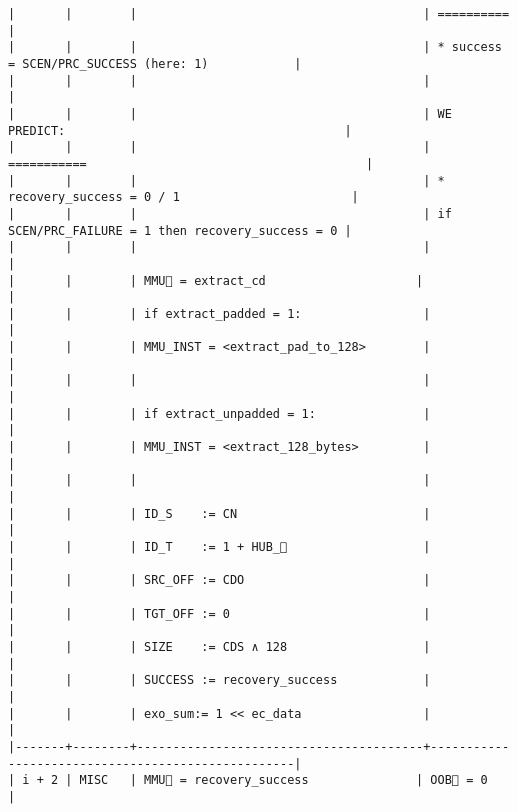 \documentclass[varwidth=\maxdimen,margin=0.5cm,multi={verbatim}]{standalone}
\begin{document}
\begin{verbatim}
|       |        |                                        | ==========                                        |
|       |        |                                        | * success = SCEN/PRC_SUCCESS (here: 1)            |
|       |        |                                        |                                                   |
|       |        |                                        | WE PREDICT:                                       |
|       |        |                                        | ===========                                       |
|       |        |                                        | * recovery_success = 0 / 1                        |
|       |        |                                        | if SCEN/PRC_FAILURE = 1 then recovery_success = 0 |
|       |        |                                        |                                                   |
|       |        | MMU🏴 = extract_cd                     |                                                   |
|       |        | if extract_padded = 1:                 |                                                   |
|       |        | MMU_INST = <extract_pad_to_128>        |                                                   |
|       |        |                                        |                                                   |
|       |        | if extract_unpadded = 1:               |                                                   |
|       |        | MMU_INST = <extract_128_bytes>         |                                                   |
|       |        |                                        |                                                   |
|       |        | ID_S    := CN                          |                                                   |
|       |        | ID_T    := 1 + HUB_                   |                                                   |
|       |        | SRC_OFF := CDO                         |                                                   |
|       |        | TGT_OFF := 0                           |                                                   |
|       |        | SIZE    := CDS ∧ 128                   |                                                   |
|       |        | SUCCESS := recovery_success            |                                                   |
|       |        | exo_sum:= 1 << ec_data                 |                                                   |
|-------+--------+----------------------------------------+---------------------------------------------------|
| i + 2 | MISC   | MMU🏴 = recovery_success               | OOB🏴 = 0                                         |

\end{verbatim}
\end{document}
